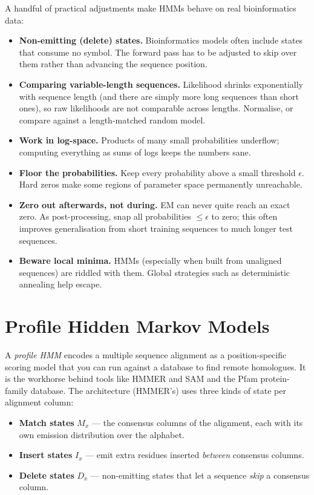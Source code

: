 \documentclass[11pt, oneside]{book}
\begin{document}
A handful of practical adjustments make HMMs behave on real bioinformatics data:

\begin{itemize}
  \item \textbf{Non-emitting (delete) states.} Bioinformatics models often
        include states that consume no symbol. The forward pass has to be
        adjusted to skip over them rather than advancing the sequence position.
  \item \textbf{Comparing variable-length sequences.} Likelihood shrinks
        exponentially with sequence length (and there are simply more long
        sequences than short ones), so raw likelihoods are not comparable across
        lengths. Normalise, or compare against a length-matched random model.
  \item \textbf{Work in log-space.} Products of many small probabilities
        underflow; computing everything as sums of logs keeps the numbers sane.
  \item \textbf{Floor the probabilities.} Keep every probability above a small
        threshold $\epsilon$. Hard zeros make some regions of parameter space
        permanently unreachable.
  \item \textbf{Zero out afterwards, not during.} EM can never quite reach an
        exact zero. As post-processing, snap all probabilities $\le \epsilon$ to
        zero; this often improves generalisation from short training sequences to
        much longer test sequences.
  \item \textbf{Beware local minima.} HMMs (especially when built from unaligned
        sequences) are riddled with them. Global strategies such as
        deterministic annealing help escape.
\end{itemize}

\section{Profile Hidden Markov Models}

A \emph{profile HMM} encodes a multiple sequence alignment as a
position-specific scoring model that you can run against a database to find
remote homologues. It is the workhorse behind tools like HMMER and SAM and the
Pfam protein-family database. The architecture (HMMER's) uses three kinds of
state per alignment column:

\begin{itemize}
  \item \textbf{Match states} $M_x$ — the consensus columns of the alignment,
        each with its own emission distribution over the alphabet.
  \item \textbf{Insert states} $I_x$ — emit extra residues inserted
        \emph{between} consensus columns.
  \item \textbf{Delete states} $D_x$ — non-emitting states that let a sequence
        \emph{skip} a consensus column.
\end{itemize}
\end{document}
